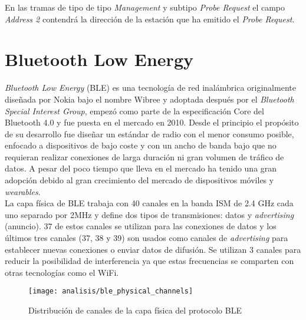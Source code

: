 \documentclass[../proyecto.tex]{subfiles}
\begin{document}
En las tramas de tipo de tipo \textit{Management} y subtipo \textit{Probe Request} el campo \textit{Address 2} contendrá la dirección de la estación que ha emitido el \textit{Probe Request}.\\


\section{Bluetooth Low Energy}

\textit{Bluetooth Low Energy} (BLE) es una tecnología de red inalámbrica originalmente diseñada por Nokia bajo el nombre Wibree y adoptada después por el \textit{Bluetooth Special Interest Group}, empezó como parte de la especificación Core del Bluetooth 4.0 y fue puesta en el mercado en 2010. Desde el principio el propósito de su desarrollo fue diseñar un estándar de radio con el menor consumo posible, enfocado a dispositivos de bajo coste y con un ancho de banda bajo que no requieran realizar conexiones de larga duración ni gran volumen de tráfico de datos. A pesar del poco tiempo que lleva en el mercado ha tenido una gran adopción debido al gran crecimiento del mercado de dispositivos móviles y \textit{wearables}.\\

La capa física de BLE trabaja con 40 canales en la banda ISM de 2.4 GHz cada uno separado por 2MHz y define dos tipos de transmisiones: datos y \textit{advertising} (anuncio). 37 de estos canales se utilizan para las conexiones de datos y los últimos tres canales (37, 38 y 39) son usados como canales de \textit{advertising} para establecer nuevas conexiones o enviar datos de difusión. Se utilizan 3 canales para reducir la posibilidad de interferencia ya que estas frecuencias se comparten con otras tecnologías como el WiFi.

\begin{figure}[H]
\centering
\texttt{[image: analisis/ble\_physical\_channels]}
\caption{Distribución de canales de la capa física del protocolo BLE \cite{townsend2014getting}}
\label{fig:ble_physical_channels}
\end{figure}
\end{document}
